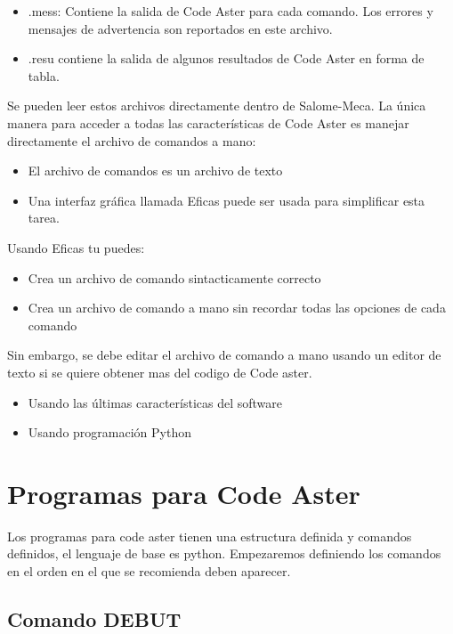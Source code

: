 \documentclass[12pt]{book}
\theoremstyle{definition}
\theoremstyle{remark}
\theoremstyle{plain}
\begin{document}
\begin{itemize}
 \item .mess: Contiene la salida de Code Aster para cada comando. Los errores y mensajes de advertencia son reportados en este archivo.
\item .resu contiene la salida de algunos resultados de Code Aster en forma de tabla.
\end{itemize}
Se pueden leer estos archivos directamente dentro de Salome-Meca.
La única manera para acceder a todas las características de Code Aster es manejar 
directamente el archivo de comandos a mano:

\begin{itemize}
 \item El archivo de comandos es un archivo de texto
 \item Una interfaz gráfica llamada Eficas puede ser usada para simplificar esta tarea.
\end{itemize}

Usando Eficas tu puedes:

\begin{itemize}
 \item Crea un archivo de comando sintacticamente correcto
 \item Crea un archivo de comando a mano sin recordar todas las opciones de cada comando
\end{itemize}

Sin embargo, se debe editar el archivo de comando a mano usando un editor
de texto si se quiere obtener mas del codigo de Code aster.
\begin{itemize}
 \item Usando las últimas características del software
 \item Usando programación Python
\end{itemize}

\section{Programas para Code Aster }

Los programas para code aster tienen una estructura definida y comandos definidos,
el lenguaje de base es python. Empezaremos definiendo los comandos en el orden 
en el que se recomienda deben aparecer.

\subsection{Comando DEBUT}
\end{document}
